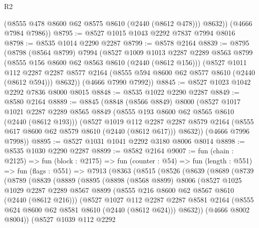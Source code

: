 \begin{lexlean}{R2}
\begin{coremodule}
          (@8555 @478 @8600 @62 @8575 @8610 (@2440 (@8612 @478)))
          @8632))
      (@4666 @7984 @7986))
@8795 := @8527 @1015 @1043 @2292 @7837 @7994 @8016
@8798 := @8535 @1014 @2290 @2287
@8799 := @8578 @2164
@8839 := @8795
    (@8798
      (@8564 @8799)
      @7994
      (@8527
        @1009
        @1013
        @2287
        @2289
        @8563
        @8799
        (@8555 @156 @8600 @62 @8563 @8610 (@2440 (@8612 @156)))
        (@8527
          @1011
          @112
          @2287
          @2287
          @8577
          @2164
          (@8555 @594 @8600 @62 @8577 @8610 (@2440 (@8612 @594)))
          @8632))
      (@4666 @7990 @7992))
@8845 := @8527 @1023 @1042 @2292 @7836 @8000 @8015
@8848 := @8535 @1022 @2290 @2287
@8849 := @8580 @2164
@8889 := @8845
    (@8848
      (@8566 @8849)
      @8000
      (@8527
        @1017
        @1021
        @2287
        @2289
        @8565
        @8849
        (@8555 @193 @8600 @62 @8565 @8610 (@2440 (@8612 @193)))
        (@8527
          @1019
          @112
          @2287
          @2287
          @8579
          @2164
          (@8555 @617 @8600 @62 @8579 @8610 (@2440 (@8612 @617)))
          @8632))
      (@4666 @7996 @7998))
@8895 := @8527 @1031 @1041 @2292 @3180 @8006 @8014
@8898 := @8535 @1030 @2290 @2287
@8899 := @8582 @2164
@9007 := fun (chain : @2125) =>
  fun (block : @2175) =>
  fun (counter : @54) =>
  fun (length : @551) =>
  fun (flags : @551) =>
  @7913
    (@8363
      (@8515
        (@8526
          (@8639
            (@8689
              (@8739
                (@8789
                  (@8839
                    (@8889
                      (@8895
                        (@8898
                          (@8568 @8899)
                          @8006
                          (@8527
                            @1025
                            @1029
                            @2287
                            @2289
                            @8567
                            @8899
                            (@8555 @216 @8600 @62 @8567 @8610 (@2440 (@8612 @216)))
                            (@8527
                              @1027
                              @112
                              @2287
                              @2287
                              @8581
                              @2164
                              (@8555 @624 @8600 @62 @8581 @8610 (@2440 (@8612 @624)))
                              @8632))
                          (@4666 @8002 @8004))
                        (@8527
                          @1039
                          @112
                          @2292

\end{coremodule}
\end{lexlean}
